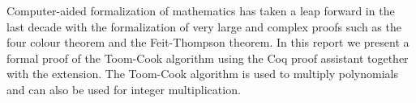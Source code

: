 Computer-aided formalization of mathematics has taken a leap forward in the
last decade with the formalization of very large and complex proofs such as the
four colour theorem and the Feit-Thompson theorem. In this report we present a
formal proof of the Toom-Cook algorithm using the Coq proof assistant together
with the \ssr extension. The Toom-Cook algorithm is used to multiply
polynomials and can also be used for integer multiplication.
